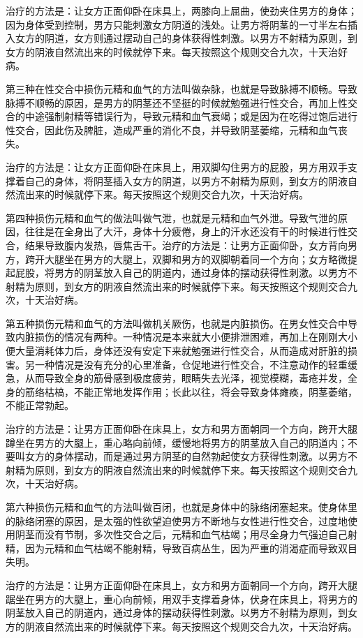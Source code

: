 \documentclass[a4paper,12pt,UTF8,twoside]{ctexbook}
\begin{document}
治疗的方法是：让女方正面仰卧在床具上，两膝向上屈曲，使劲夹住男方的身体；因为身体受到控制，男方只能刺激女方阴道的浅处。让男方将阴茎的一寸半左右插入女方的阴道，女方则通过摆动自己的身体获得性刺激。以男方不射精为原则，到女方的阴液自然流出来的时候就停下来。每天按照这个规则交合九次，十天治好病。

第三种在性交合中损伤元精和血气的方法叫做杂脉，也就是导致脉搏不顺畅。导致脉搏不顺畅的原因，是男方的阴茎还不坚挺的时候就勉强进行性交合，再加上性交合的中途强制射精等错误行为，导致元精和血气衰竭；或是因为在吃得过饱后进行性交合，因此伤及脾脏，造成严重的消化不良，并导致阴茎萎缩，元精和血气丧失。

治疗的方法是：让女方正面仰卧在床具上，用双脚勾住男方的屁股，男方用双手支撑着自己的身体，将阴茎插入女方的阴道，以男方不射精为原则，到女方的阴液自然流出来的时候就停下来。每天按照这个规则交合九次，十天治好病。

第四种损伤元精和血气的做法叫做气泄，也就是元精和血气外泄。导致气泄的原因，往往是在全身出了大汗，身体十分疲倦，身上的汗水还没有干的时候进行性交合，结果导致腹内发热，唇焦舌干。治疗的方法是：让男方正面仰卧，女方背向男方，跨开大腿坐在男方的大腿上，双脚和男方的双脚朝着同一个方向；女方略微提起屁股，将男方的阴茎放入自己的阴道内，通过身体的摆动获得性刺激。以男方不射精为原则，到女方的阴液自然流出来的时候就停下来。每天按照这个规则交合九次，十天治好病。

第五种损伤元精和血气的方法叫做机关厥伤，也就是内脏损伤。在男女性交合中导致内脏损伤的情况有两种。一种情况是本来就大小便排泄困难，再加上在刚刚大小便大量消耗体力后，身体还没有安定下来就勉强进行性交合，从而造成对肝脏的损害。另一种情况是没有充分的心里准备，仓促地进行性交合，不注意动作的轻重缓急，从而导致全身的筋骨感到极度疲劳，眼睛失去光泽，视觉模糊，毒疮并发，全身的筋络枯槁，不能正常地发挥作用；长此以往，将会导致身体瘫痪，阴茎萎缩，不能正常勃起。

治疗的方法是：让男方正面仰卧在床具上，女方和男方面朝同一个方向，跨开大腿蹲坐在男方的大腿上，重心略向前倾，缓慢地将男方的阴茎放入自己的阴道内；不要叫女方的身体摆动，而是通过男方阴茎的自然勃起使女方获得性刺激。以男方不射精为原则，到女方的阴液自然流出来的时候就停下来。每天按照这个规则交合九次，十天治好病。

第六种损伤元精和血气的方法叫做百闭，也就是身体中的脉络闭塞起来。使身体里的脉络闭塞的原因，是太强的性欲望迫使男方不断地与女性进行性交合，过度地使用阴茎而没有节制，多次性交合之后，元精和血气枯竭；用尽全身力气强迫自己射精，因为元精和血气枯竭不能射精，导致百病丛生，因为严重的消渴症而导致双目失明。

治疗的方法是：让男方正面仰卧在床具上，女方和男方面朝同一个方向，跨开大腿踞坐在男方的大腿上，重心向前倾，用双手支撑着身体，伏身在床具上，将男方的阴茎放入自己的阴道内，通过身体的摆动获得性刺激。以男方不射精为原则，到女方的阴液自然流出来的时候就停下来。每天按照这个规则交合九次，十天治好病。
\end{document}
